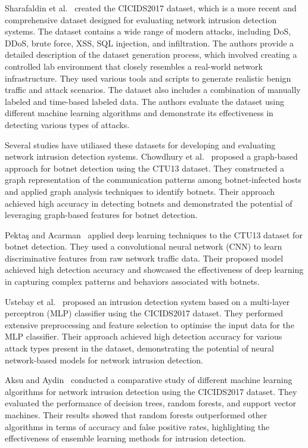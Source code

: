 Sharafaldin et al.~\cite{sharafaldin2018toward} created the CICIDS2017 dataset, which is a more recent and comprehensive dataset designed for evaluating network intrusion detection systems. The dataset contains a wide range of modern attacks, including DoS, DDoS, brute force, XSS, SQL injection, and infiltration. The authors provide a detailed description of the dataset generation process, which involved creating a controlled lab environment that closely resembles a real-world network infrastructure. They used various tools and scripts to generate realistic benign traffic and attack scenarios. The dataset also includes a combination of manually labeled and time-based labeled data. The authors evaluate the dataset using different machine learning algorithms and demonstrate its effectiveness in detecting various types of attacks.

Several studies have utiliased these datasets for developing and evaluating network intrusion detection systems. Chowdhury et al.~\cite{chowdhury2017botnet} proposed a graph-based approach for botnet detection using the CTU13 dataset. They constructed a graph representation of the communication patterns among botnet-infected hosts and applied graph analysis techniques to identify botnets. Their approach achieved high accuracy in detecting botnets and demonstrated the potential of leveraging graph-based features for botnet detection.

Pektaş and Acarman~\cite{pektacs2019deep} applied deep learning techniques to the CTU13 dataset for botnet detection. They used a convolutional neural network (CNN) to learn discriminative features from raw network traffic data. Their proposed model achieved high detection accuracy and showcased the effectiveness of deep learning in capturing complex patterns and behaviors associated with botnets.

Ustebay et al.~\cite{ustebay2018intrusion} proposed an intrusion detection system based on a multi-layer perceptron (MLP) classifier using the CICIDS2017 dataset. They performed extensive preprocessing and feature selection to optimise the input data for the MLP classifier. Their approach achieved high detection accuracy for various attack types present in the dataset, demonstrating the potential of neural network-based models for network intrusion detection.

Aksu and Aydin~\cite{aksu2018detecting} conducted a comparative study of different machine learning algorithms for network intrusion detection using the CICIDS2017 dataset. They evaluated the performance of decision trees, random forests, and support vector machines. Their results showed that random forests outperformed other algorithms in terms of accuracy and false positive rates, highlighting the effectiveness of ensemble learning methods for intrusion detection.

